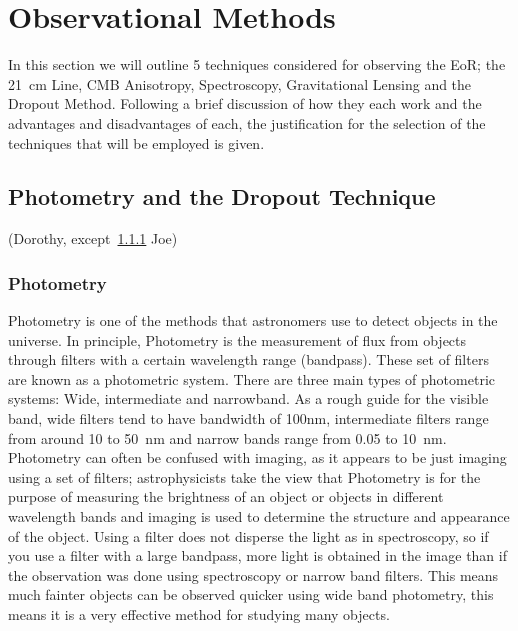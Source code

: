 
\section{Observational Methods} %
	In this section we will outline 5 techniques considered for observing the EoR; the \SI{21}{\centi\metre} Line, CMB Anisotropy, Spectroscopy, Gravitational Lensing and the Dropout Method. Following a brief discussion of how they each work and the advantages and disadvantages of each, the justification for the selection of the techniques that will be employed is given.

	\subsection{Photometry and the Dropout Technique} %
		\label{ssub:filters_and_the_dropout_technique}
		(Dorothy, except~\ref{ssub:photometry} Joe)

		\subsubsection{Photometry} %
		\label{ssub:photometry}
			Photometry is one of the methods that astronomers use to detect objects in the universe. In principle, Photometry is the measurement of flux from objects through filters with a certain wavelength range (bandpass). These set of filters are known as a photometric system. There are three main types of photometric systems: Wide, intermediate and narrowband. As a rough guide for the visible band, wide filters tend to have bandwidth of 100nm, intermediate filters range from around 10 to \SI{50}{\nano\metre} and narrow bands range from 0.05 to \SI{10}{\nano\metre}\cite{Kitchin}. Photometry can often be confused with imaging, as it appears to be just imaging using a set of filters; astrophysicists take the view that Photometry is for the purpose of measuring the brightness of an object or objects in different wavelength bands and imaging is used to determine the structure and appearance of the object\cite{Kitchin}. Using a filter does not disperse the light as in spectroscopy, so if you use a filter with a large bandpass, more light is obtained in the image than if the observation was done using spectroscopy or narrow band filters. This means much fainter objects can be observed quicker using wide band photometry, this means it is a very effective method for studying many objects\cite{Romanishin}.

